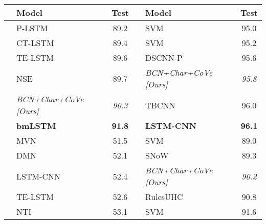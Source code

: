 \documentclass{article}
\begin{document}
\begin{table}
  \centering
  \setlength\tabcolsep{3.65pt}
\begin{tabular}{llcllc}
    \toprule
 & Model & Test &  & Model & Test\\
\midrule
 \parbox[t]{2mm}{} & P-LSTM~\citep{Wieting2015TowardsUP} & 89.2             & \parbox[t]{2mm}{} & SVM~\citep{Silva2011FromST} & 95.0           \\
                        & CT-LSTM~\citep{Looks2017DeepLW} & 89.4             &                         & SVM~\citep{Vantu2016QC}  & 95.2              \\
                        & TE-LSTM~\citep{Huang2017EncodingSK} & 89.6             &                         & DSCNN-P~\citep{Zhang2016DependencySC} & 95.6             \\
                        & NSE~\citep{Munkhdalai2016NeuralSE} & 89.7             &                         & {\it BCN+Char+CoVe [Ours] }& {\it95.8 }          \\
                        & {\it BCN+Char+CoVe [Ours]           }          & {\it90.3}          &                         &  TBCNN~\citep{Mou2015DiscriminativeNS}& 96.0             \\
                        & \textbf{bmLSTM~\citep{Radford2017LearningTG}} & \textbf{91.8}             &                         & \textbf{LSTM-CNN~\citep{Zhou2016TextCI}}            & \textbf{96.1} \\
\midrule
 \parbox[t]{2mm}{} & MVN~\citep{Guo2017EndtoEndMN} & 51.5          & \parbox[t]{2mm}{}& SVM~\citep{Loni2011QuestionCB}&89.0           \\
                        & DMN~\citep{Kumar2016} & 52.1             &                         & SNoW~\citep{Li2006LearningQC} & 89.3             \\
                        & LSTM-CNN~\citep{Zhou2016TextCI} & 52.4             &                         & {\it BCN+Char+CoVe [Ours]        }           & {\it90.2}             \\
                        & TE-LSTM~\citep{Huang2017EncodingSK} & 52.6             &                         & RulesUHC~\citep{Silva2011FromST}       & 90.8             \\
                        & NTI~\citep{Munkhdalai2016NeuralTI} & 53.1             &                         &  SVM~\citep{Vantu2016QC}                    &     91.6      \\

\end{tabular}
\end{table}
\end{document}
